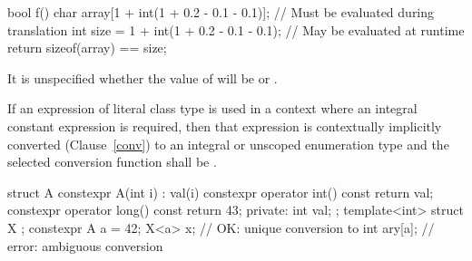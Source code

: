\begin{codeblock}
bool f() {
    char array[1 + int(1 + 0.2 - 0.1 - 0.1)];  // Must be evaluated during translation
    int size = 1 + int(1 + 0.2 - 0.1 - 0.1);   // May be evaluated at runtime
    return sizeof(array) == size;
}
\end{codeblock}
It is unspecified whether the value of  will be  or .
\exitexample \exitnote

\pnum
If an expression of literal class type is used in a context where an 
integral constant expression is required, then that expression is
contextually implicitly converted (Clause~\ref{conv}) to an integral or unscoped
enumeration type 
and the selected conversion function shall be . \enterexample
\begin{codeblock}
struct A { 
  constexpr A(int i) : val(i) { } 
  constexpr operator int() const { return val; }
  constexpr operator long() const { return 43; }
private: 
  int val; 
}; 
template<int> struct X { }; 
constexpr A a = 42; 
X<a> x;             // OK: unique conversion to 
int ary[a];         // error: ambiguous conversion 
\end{codeblock}
\exitexample%
